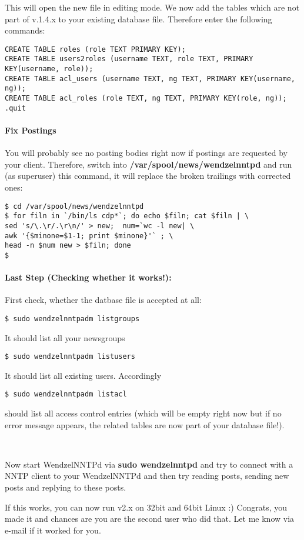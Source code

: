 This will open the new file in editing mode. We now add the tables which are not part of v.1.4.x to your existing database file. Therefore enter the following commands:

\begin{verbatim}
CREATE TABLE roles (role TEXT PRIMARY KEY);
CREATE TABLE users2roles (username TEXT, role TEXT, PRIMARY KEY(username, role));
CREATE TABLE acl_users (username TEXT, ng TEXT, PRIMARY KEY(username, ng));
CREATE TABLE acl_roles (role TEXT, ng TEXT, PRIMARY KEY(role, ng));
.quit
\end{verbatim}


\paragraph*{Fix Postings}

You will probably see no posting bodies right now if postings are requested by your client. Therefore, switch into {\bf /var/spool/news/wendzelnntpd} and run (as superuser) this command, it will replace the broken trailings with corrected ones:

\begin{verbatim}
$ cd /var/spool/news/wendzelnntpd 
$ for filn in `/bin/ls cdp*`; do echo $filn; cat $filn | \
sed 's/\.\r/.\r\n/' > new;  num=`wc -l new| \
awk '{$minone=$1-1; print $minone}'` ; \
head -n $num new > $filn; done
$
\end{verbatim}

\paragraph*{Last Step (Checking whether it works!):}

First check, whether the datbase file is accepted at all:

\begin{verbatim}
$ sudo wendzelnntpadm listgroups
\end{verbatim}

It should list all your newsgroups

\begin{verbatim}
$ sudo wendzelnntpadm listusers
\end{verbatim}

It should list all existing users. Accordingly

\begin{verbatim}
$ sudo wendzelnntpadm listacl
\end{verbatim}

should list all access control entries (which will be empty right now but if no error message appears, the related tables are now part of your database file!).

~

Now start WendzelNNTPd via {\bf sudo wendzelnntpd} and try to connect with a NNTP client to your WendzelNNTPd and then try reading posts, sending new posts and replying to these posts.

If this works, you can now run v2.x on 32bit and 64bit Linux :) Congrats, you made it and chances are you are the second user who did that. Let me know via e-mail if it worked for you.


